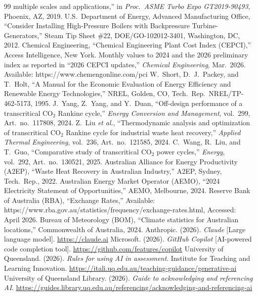 \begin{thebibliography}{99}
multiple scales and applications,''
in \textit{Proc.\ ASME Turbo Expo GT2019-90493}, Phoenix, AZ, 2019.
U.S.\ Department of Energy, Advanced Manufacturing Office,
``Consider Installing High-Pressure Boilers with Backpressure Turbine-Generators,''
Steam Tip Sheet \#22, DOE/GO-102012-3401, Washington, DC, 2012.
Chemical Engineering,
``Chemical Engineering Plant Cost Index (CEPCI),''
Access Intelligence, New York. Monthly values to 2024 and the 2026
preliminary index as reported in ``2026 CEPCI updates,'' \textit{Chemical
Engineering}, Mar.\ 2026. Available: https://www.chemengonline.com/pci
W.~Short, D.~J.~Packey, and T.~Holt,
``A Manual for the Economic Evaluation of Energy Efficiency and Renewable
Energy Technologies,''
NREL, Golden, CO, Tech.\ Rep.\ NREL/TP-462-5173, 1995.
J.~Yang, Z.~Yang, and Y.~Duan,
``Off-design performance of a transcritical CO$_2$ Rankine cycle,''
\textit{Energy Conversion and Management}, vol.~299, Art.\ no.~117808, 2024.
Z.~Liu \textit{et al.},
``Thermodynamic analysis and optimization of transcritical CO$_2$ Rankine
cycle for industrial waste heat recovery,''
\textit{Applied Thermal Engineering}, vol.~236, Art.\ no.~121585, 2024.
C.~Wang, R.~Liu, and T.~Guo,
``Comparative study of transcritical CO$_2$ power cycles,''
\textit{Energy}, vol.~292, Art.\ no.~130521, 2025.
Australian Alliance for Energy Productivity (A2EP),
``Waste Heat Recovery in Australian Industry,''
A2EP, Sydney, Tech.\ Rep., 2022.
Australian Energy Market Operator (AEMO),
``2024 Electricity Statement of Opportunities,''
AEMO, Melbourne, 2024.
Reserve Bank of Australia (RBA),
``Exchange Rates,'' Available: https://www.rba.gov.au/statistics/frequency/exchange-rates.html,
Accessed: April 2026.
Bureau of Meteorology (BOM),
``Climate statistics for Australian locations,''
Commonwealth of Australia, 2024.
Anthropic. (2026). \textit{Claude} [Large language model].
\url{https://claude.ai}
Microsoft. (2026). \textit{GitHub Copilot}
[AI-powered code completion tool].
\url{https://github.com/features/copilot}
University of Queensland. (2026).
\textit{Rules for using AI in assessment}.
Institute for Teaching and Learning Innovation.
\url{https://itali.uq.edu.au/teaching-guidance/generative-ai}
University of Queensland Library. (2026).
\textit{Guide to acknowledging and referencing AI}.
\url{https://guides.library.uq.edu.au/referencing/acknowledging-and-referencing-ai}
\end{thebibliography}
